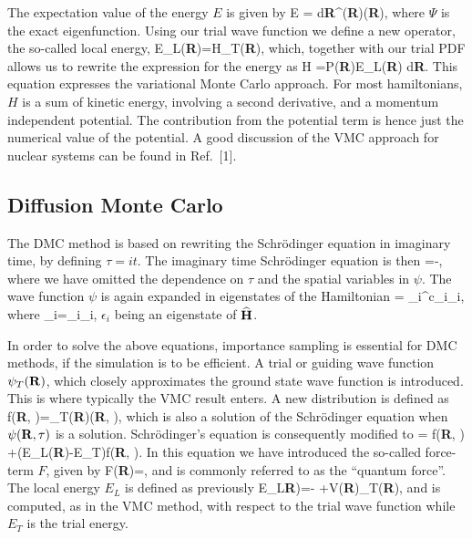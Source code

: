 The expectation value of the energy $E$
is given by
\be
   \langle E \rangle =
        {\int d{\bf R}\Psi^{\ast}({\bf R})\Psi({\bf R})},
\ee
where $\Psi$ is the exact eigenfunction. Using our trial
wave function we define a new operator, 
the so-called  
local energy, 
\be
   E_L({\bf R})=H\psi_T({\bf R}),
   \label{eq:locale1}
\ee
which, together with our trial PDF allows us to rewrite the 
expression for the energy as
\be
  \langle H \rangle =\int P({\bf R})E_L({\bf R}) d{\bf R}.
  \label{eq:vmc1}
\ee
This equation expresses the variational Monte Carlo approach.
For most hamiltonians, $H$ is a sum of kinetic energy, involving 
a second derivative, and a momentum independent potential. 
The contribution from the potential term is hence just the 
numerical value of the potential.
A good discussion of the VMC approach for nuclear systems can be found 
in Ref.~[1].
\subsection*{Diffusion Monte Carlo}
The DMC method is based on rewriting the 
Schr\"odinger equation in imaginary time, by defining
$\tau=it$. The imaginary time Schr\"odinger equation is then
\be
   \frac{\partial \psi}{\partial \tau}=-\psi,
\ee
where we have omitted the dependence on $\tau$ and the spatial variables
in $\psi$.
The wave function $\psi$  is again expanded in eigenstates of the Hamiltonian 
\be
    \psi = \sum_i^{\infty}c_i\phi_i,
    \label{eq:wexpansion_dmc}
\ee 
where 
\be 
   \phi_i=\epsilon_i\phi_i, 
\ee 
$\epsilon_i$ being an eigenstate of ${\bf\widehat{H}}$. 

In order to solve the above equations, 
importance sampling is essential for DMC methods, 
if the simulation is to be efficient. 
A trial or guiding wave function $\psi_T({\bf R})$, which closely
approximates the ground state wave function is introduced.
This is where typically the VMC result enters.
A new distribution is defined as 
\be
   f({\bf R}, \tau)=\psi_T({\bf R})\psi({\bf R}, \tau),
\ee
which is also a solution of the Schr\"odinger equation when  
$\psi({\bf R}, \tau)$ 
is a solution. 
Schr\"odinger's equation is consequently modified to
\be
   =
    \nabla{}f({\bf R}, \tau)
    +(E_L({\bf R})-E_T)f({\bf R}, \tau).
    \label{eq:dmcequation2}
\ee
In this equation we have introduced the so-called force-term $F$,
given by
\be
   F({\bf R})=,
\ee
and is commonly referred to as the ``quantum force''. 
The local energy $E_L$ is defined as previously
\be
    E_L{\bf R})=-
                +V({\bf R})\psi_T({\bf R}),
\ee
and is computed, as in the VMC method, with respect to the trial wave function
while $E_T$ is the trial energy.

